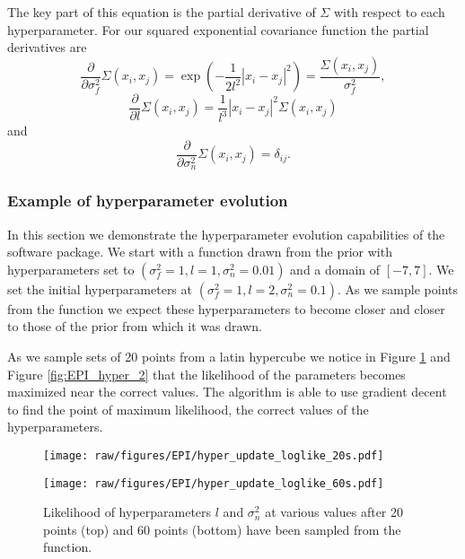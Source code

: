 The key part of this equation is the partial derivative of $\Sigma$ with respect to each hyperparameter. For our squared exponential covariance function the partial derivatives are
\begin{equation}
    \frac{\partial}{\partial \sigma_{f}^{2}} \Sigma(x_{i}, x_{j}) = \exp\left( -\frac{1}{2l^{2}} |x_{i} - x_{j}|^{2}\right) = \frac{\Sigma(x_{i}, x_{j})}{\sigma_{f}^{2}},
\end{equation}
\begin{equation}
    \frac{\partial}{\partial l} \Sigma(x_{i}, x_{j}) = \frac{1}{l^{3}}|x_{i} - x_{j}|^{2}\Sigma(x_{i}, x_{j})
\end{equation}
and
\begin{equation}
    \frac{\partial}{\partial \sigma_{n}^{2}} \Sigma(x_{i}, x_{j}) = \delta_{ij}.
\end{equation}

\subsubsection{Example of hyperparameter evolution}

In this section we demonstrate the hyperparameter evolution capabilities of the software package. We start with a function drawn from the prior with hyperparameters set to $(\sigma_{f}^{2} = 1, l = 1, \sigma_{n}^{2} = 0.01)$ and a domain of $[-7,7]$. We set the initial hyperparameters at $(\sigma_{f}^{2} = 1, l = 2, \sigma_{n}^{2} = 0.1)$. As we sample points from the function we expect these hyperparameters to become closer and closer to those of the prior from which it was drawn.

As we sample sets of 20 points from a latin hypercube we notice in Figure \ref{fig:EPI_hyper_1} and Figure \ref{fig:EPI_hyper_2} that the likelihood of the parameters becomes maximized near the correct values. The algorithm is able to use gradient decent to find the point of maximum likelihood, the correct values of the hyperparameters.

\begin{figure}[hpt]
 	\centerline{\texttt{[image: raw/figures/EPI/hyper\_update\_loglike\_20s.pdf]}}
    \centerline{\texttt{[image: raw/figures/EPI/hyper\_update\_loglike\_60s.pdf]}}
    \caption[Likelihood of hyperparameters]{Likelihood of hyperparameters $l$ and $\sigma_{n}^{2}$ at various values after 20 points (top) and 60 points (bottom) have been sampled from the function.}
 	\label{fig:EPI_hyper_1}
\end{figure}

